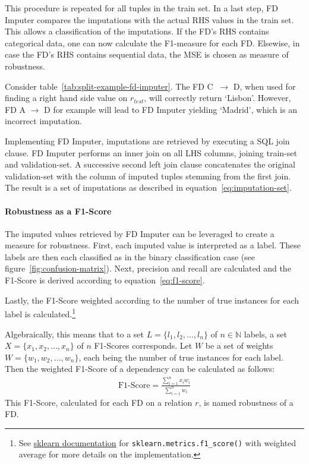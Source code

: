 This procedure is repeated for all tuples in the train set.
In a last step, FD Imputer compares the imputations with the actual RHS values in the train set.
This allows a classification of the imputations.
If the FD's RHS contains categorical data, one can now calculate the F1-measure for each FD.
Elsewise, in case the FD's RHS contains sequential data, the MSE is chosen as measure of robustness.

Consider table~\ref{tab:split-example-fd-imputer}.
The FD \textsc{C} \( \ \to \) \textsc{D}, when used for finding a right hand side value on \( r_{test} \), will correctly return `Lisbon'.
However, FD \textsc{A} \( \to \) \textsc{D} for example will lead to FD Imputer yielding `Madrid', which is an incorrect imputation.

Implementing FD Imputer, imputations are retrieved by executing a SQL join clause.
FD Imputer performs an inner join on all LHS columns, joining train-set and validation-set.
A successive second left join clause concatenates the original validation-set with the column of imputed tuples stemming from the first join.
The result is a set of imputations as described in equation~\ref{eq:imputation-set}.

\paragraph{Robustness as a F1-Score} The imputed values retrieved by FD Imputer can be leveraged to create a measure for robustness.
First, each imputed value is interpreted as a label.
These labels are then each classified as in the binary classification case (see figure~\ref{fig:confusion-matrix}).
Next, precision and recall are calculated and the F1-Score is derived according to equation~\ref{eq:f1-score}.

Lastly, the F1-Score weighted according to the number of true instances for each label is calculated.\footnote{See \href{https://scikit-learn.org/stable/modules/generated/sklearn.metrics.f1_score.html}{sklearn documentation} for \texttt{sklearn.metrics.f1\_score()} with weighted average for more details on the implementation.}

Algebraically, this means that to a set \( L = \{ l_1, l_2, \dots, l_n \} \) of \( n \in \mathbb{N} \) labels, a set \( X = \{ x_1, x_2, \dots, x_n \}\) of \( n \) F1-Scores corresponds.
Let \( W \) be a set of weights \( W = \{ w_1, w_2, \dots, w_n \} \), each being the number of true instances for each label.
Then the weighted F1-Score of a dependency can be calculated as follows:
\begin{align}\label{eq:fd-imputer-f1-score}
    \text{F1-Score} = \frac{\sum_{i=1}^{n} x_i w_i}{\sum_{i=1}^{n}w_i}
\end{align}
This F1-Score, calculated for each FD on a relation \( r \), is named robustness of a FD.

